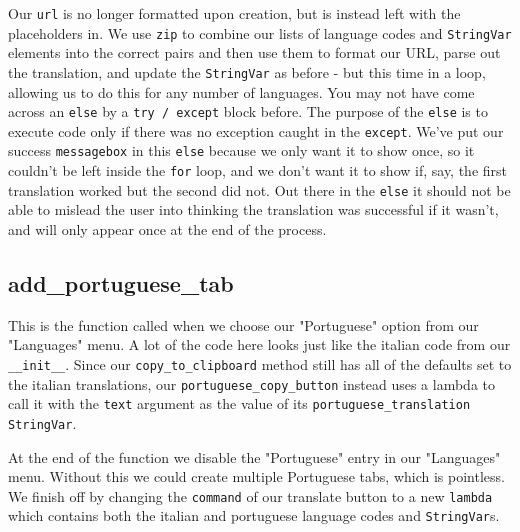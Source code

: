 \documentclass[a4paper,11pt,openany]{book}
\begin{document}
Our \lstinline[columns=fixed]{url} is no longer formatted upon creation, but is instead left with the placeholders in. We use \lstinline[columns=fixed]{zip} to combine our lists of language codes and \lstinline[columns=fixed]{StringVar} elements into the correct pairs and then use them to format our URL, parse out the translation, and update the \lstinline[columns=fixed]{StringVar} as before - but this time in a loop, allowing us to do this for any number of languages. You may not have come across an \lstinline[columns=fixed]{else} by a \lstinline[columns=fixed]{try / except} block before. The purpose of the \lstinline[columns=fixed]{else} is to execute code only if there was no exception caught in the \lstinline[columns=fixed]{except}. We've put our success \lstinline[columns=fixed]{messagebox} in this \lstinline[columns=fixed]{else} because we only want it to show once, so it couldn't be left inside the \lstinline[columns=fixed]{for} loop, and we don't want it to show if, say, the first translation worked but the second did not. Out there in the \lstinline[columns=fixed]{else} it should not be able to mislead the user into thinking the translation was successful if it wasn't, and will only appear once at the end of the process.

\subsection{add\_portuguese\_tab}

This is the function called when we choose our "Portuguese" option from our "Languages" menu. A lot of the code here looks just like the italian code from our \lstinline[columns=fixed]{__init__}. Since our \lstinline[columns=fixed]{copy_to_clipboard} method still has all of the defaults set to the italian translations, our \lstinline[columns=fixed]{portuguese_copy_button} instead uses a lambda to call it with the \lstinline[columns=fixed]{text} argument as the value of its \lstinline[columns=fixed]{portuguese_translation StringVar}. 

\vspace{5mm}

At the end of the function we disable the "Portuguese" entry in our "Languages" menu. Without this we could create multiple Portuguese tabs, which is pointless. We finish off by changing the \lstinline[columns=fixed]{command} of our translate button to a new \lstinline[columns=fixed]{lambda} which contains both the italian and portuguese language codes and \lstinline[columns=fixed]{StringVar}s.   
\end{document}
